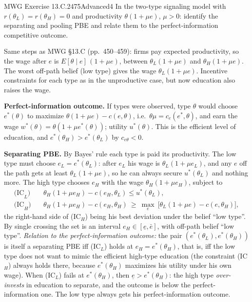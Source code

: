 \begin{exsol}{MWG Exercise 13.C.2}{475}{Advanced}{4}
\asked In the two-type signaling model with $r(\theta_L) = r(\theta_H) = 0$ and productivity
$\theta(1 + \mu e)$, $\mu > 0$: identify the separating and pooling PBE and relate them to the
perfect-information competitive outcome.

\method Same steps as MWG \S13.C (pp.~450--459): firms pay expected productivity, so the wage after $e$ is
$E[\theta \mid e]\,(1 + \mu e)$, between $\theta_L(1 + \mu e)$ and $\theta_H(1 + \mu e)$. The worst off-path belief
(low type) gives the wage $\theta_L(1 + \mu e)$. Incentive constraints for each type as in the
unproductive case, but now education also raises the wage.

\solution \textbf{Perfect-information outcome.} If types were observed, type $\theta$ would choose $e^*(\theta)$ to
maximize $\theta(1 + \mu e) - c(e, \theta)$, i.e.\ $\theta\mu = c_e(e^*, \theta)$, and earn the wage
$w^*(\theta) = \theta(1 + \mu e^*(\theta))$; utility $u^*(\theta)$. This is the efficient level of education, and
$e^*(\theta_H) > e^*(\theta_L)$ by $c_{e\theta} < 0$.

\textbf{Separating PBE.} By Bayes' rule each type is paid its productivity. The low type must choose
$e_L = e^*(\theta_L)$: after $e_L$ his wage is $\theta_L(1 + \mu e_L)$, and any $e$ off the path gets at least
$\theta_L(1+\mu e)$, so he can always secure $u^*(\theta_L)$ and nothing more. The high type chooses
$e_H$ with the wage $\theta_H(1 + \mu e_H)$, subject to
\begin{align*}
  \text{(IC}_L\text{)}&\quad \theta_H(1 + \mu e_H) - c(e_H, \theta_L) \le u^*(\theta_L), \\
  \text{(IC}_H\text{)}&\quad \theta_H(1 + \mu e_H) - c(e_H, \theta_H) \ \ge\ \max_{e}\ \bigl[\theta_L(1+\mu e) - c(e, \theta_H)\bigr],
\end{align*}
the right-hand side of (IC$_H$) being his best deviation under the belief ``low type''. By single
crossing the set is an interval $e_H \in [\underline{e}, \bar e]$, with off-path belief ``low type''.
\emph{Relation to the perfect-information outcome:} the pair $(e^*(\theta_L), e^*(\theta_H))$ is itself a separating
PBE iff (IC$_L$) holds at $e_H = e^*(\theta_H)$, that is, iff the low type does not want to mimic the efficient
high-type education (the constraint (IC$_H$) always holds there, because $e^*(\theta_H)$ maximizes his
utility under his own wage). When (IC$_L$) fails at $e^*(\theta_H)$, then $\underline{e} > e^*(\theta_H)$:
the high type \emph{over-invests} in education to separate, and the outcome is below the
perfect-information one. The low type always gets his perfect-information outcome.


\end{exsol}
